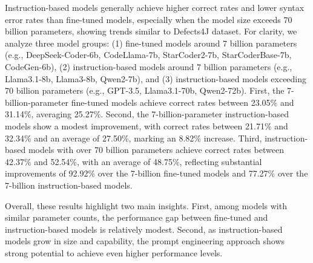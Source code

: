 Instruction-based models generally achieve higher correct rates and lower syntax error rates than fine-tuned models, especially when the model size exceeds 70 billion parameters, showing trends similar to Defects4J dataset. 
For clarity, we analyze three model groups: (1) fine-tuned models around 7 billion parameters (e.g., DeepSeek-Coder-6b, CodeLlama-7b, StarCoder2-7b, StarCoderBase-7b, CodeGen-6b), (2) instruction-based models around 7 billion parameters (e.g., Llama3.1-8b, Llama3-8b, Qwen2-7b), and (3) instruction-based models exceeding 70 billion parameters (e.g., GPT-3.5, Llama3.1-70b, Qwen2-72b).
First, the 7-billion-parameter fine-tuned models achieve correct rates between 23.05\% and 31.14\%, averaging 25.27\%. 
Second, the 7-billion-parameter instruction-based models show a modest improvement, with correct rates between 21.71\% and 32.34\% and an average of 27.50\%, marking an 8.82\% increase. 
Third, instruction-based models with over 70 billion parameters achieve correct rates between 42.37\% and 52.54\%, with an average of 48.75\%, reflecting substantial improvements of 92.92\% over the 7-billion fine-tuned models and 77.27\% over the 7-billion instruction-based models.

Overall, these results highlight two main insights. First, among models with similar parameter counts, the performance gap between fine-tuned and instruction-based models is relatively modest. Second, as instruction-based models grow in size and capability, the prompt engineering approach shows strong potential to achieve even higher performance levels.


